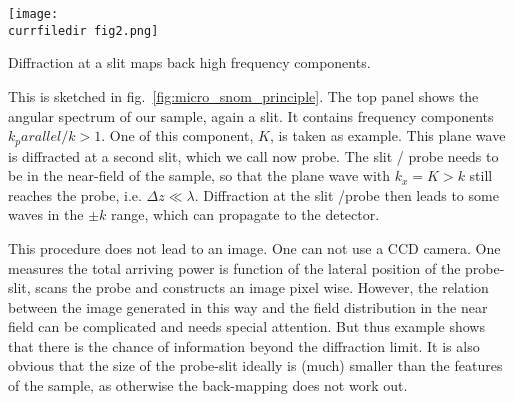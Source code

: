 \begin{marginfigure}
    \texttt{[image: \\currfiledir fig2.png]}
    \caption{Diffraction at a slit maps back high frequency components.\label{fig:micro_snom_principle}}
\end{marginfigure}


This is sketched in fig.~\ref{fig:micro_snom_principle}. The top panel shows the angular spectrum of our sample, again a slit. It contains frequency components $k_parallel / k > 1$. One of this component, $K$, is taken as example. This plane wave is diffracted at a second slit, which we call now probe. The slit / probe needs to be in the near-field of the sample, so that the plane wave with $k_x = K > k$ still reaches the probe, i.e. $\Delta z \ll \lambda$. Diffraction at the slit /probe then leads to some waves in the $\pm k$ range, which can propagate to the detector.

This procedure does not lead to an image. One can not use a CCD camera. One measures the total arriving power is function of the lateral position of the probe-slit, scans the probe and constructs an image pixel wise. However, the relation between the image generated in this way and the field distribution in the near field can be complicated and needs special attention. But thus example shows that there is the chance of information beyond the diffraction limit. It is also obvious that the size of the probe-slit ideally is  (much) smaller than the features of the sample, as otherwise the back-mapping does not work out.






\printbibliography[segment=\therefsegment,heading=subbibliography]

